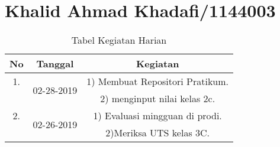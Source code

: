 \chapter{Khalid Ahmad Khadafi/1144003}

\begin{table}[h]
\caption{Tabel Kegiatan Harian}
\centering
\begin{tabular}{|c|c|c|}
\hline
No&Tanggal&Kegiatan\\
\hline
1.&\multirow{2}{*}{02-28-2019}&1) Membuat Repositori Pratikum.\\
&&2) menginput nilai kelas 2c.\\
\hline
2.&\multirow{2}{*}{02-26-2019}&1) Evaluasi mingguan di prodi.\\
&&2)Meriksa UTS kelas 3C.\\
\hline
\end{tabular}
\label{table:contoh}
\end{table}
